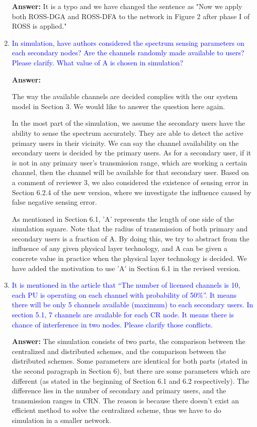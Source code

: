 \documentclass[10pt,a4paper]{article}
\begin{document}
\begin{enumerate}
\textbf{Answer:} It is a typo and we have changed the sentence as "Now we apply both ROSS-DGA and ROSS-DFA to the network in Figure 2 after phase I of ROSS is applied."
    
\item \textcolor{blue}{  In simulation, have authors considered the spectrum sensing parameters on each secondary nodes? Are the channels randomly made available to users? Please clarify. What value of A is chosen in simulation?}

\textbf{Answer:} 

The way the available channels are decided complies with the our system model in Section 3.
We would like to answer the question here again.

In the most part of the simulation, we assume the secondary users have the ability to sense the spectrum accurately.
They are able to detect the active primary users in their vicinity.
We can say the channel availability on the secondary users is decided by the primary users.
As for a secondary user, if it is not in any primary user's transmission range, which are working a certain channel, then the channel will be available for that secondary user. 
Based on a comment of reviewer 3, we also considered the existence of sensing error in Section 6.2.4 of the new version, where we investigate the influence caused by false negative sensing error.

As mentioned in Section 6.1, 'A' represents the length of one side of the simulation square.
    Note that the radius of transmission of both primary and secondary users is a fraction of A.
    By doing this, we try to abstract from the influence of any given physical layer technology, and A can be given a concrete value in practice when the physical layer technology is decided.
    We have added the motivation to use 'A' in Section 6.1 in the revised version.
    
    
    
\item \textcolor{blue}{ It is mentioned in the article that “The number of licensed channels is 10, each PU is operating on each channel with probability of 50\%”. It means there will be only 5 channels available (maximum) to each secondary users. In section 5.1, 7 channels are available for each CR node. It means there is chance of interference in two nodes. Please clarify those conflicts.}

\textbf{Answer:} 
The simulation consists of two parts, the comparison between the centralized and distributed schemes, and the comparison between the distributed schemes.
Some parameters are identical for both parts (stated in the second paragraph in Section 6), but there are some parameters which are different (as stated in the beginning of Section 6.1 and 6.2 respectively).
The difference lies in the number of secondary and primary users, and the transmission ranges in CRN.
The reason is because there doesn't exist an efficient method to solve the centralized scheme, thus we have to do simulation in a smaller network.


\end{enumerate}
\end{document}
